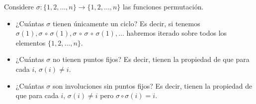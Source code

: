 \begin{statement}{4}
  Considere $\sigma: \{1, 2, \dots, n\} \to \{1, 2, \dots, n\}$ las funciones
  permutaci\'on.
  \begin{itemize}
    \item ¿Cu\'antas $\sigma$ tienen \'unicamente un ciclo? Es decir, si
    tenemos $\sigma(1), \sigma\, \circ\, \sigma(1), \sigma\, \circ\, \sigma\, \circ\,
    \sigma(1), \dots$ habremos iterado sobre todos los elementos
    $\{1, 2, \dots, n\}$.
    \item ¿Cu\'antas $\sigma$ no tienen puntos fijos? Es decir, tienen la
    propiedad de que para cada $i$, $\sigma(i) \neq i$.
    \item ¿Cu\'antas $\sigma$ son involuciones sin puntos fijos? Es decir, tienen
    la propiedad de que para cada $i$, $\sigma(i) \neq i$ pero $\sigma \circ \sigma(i) = i$.
  \end{itemize}
\end{statement}